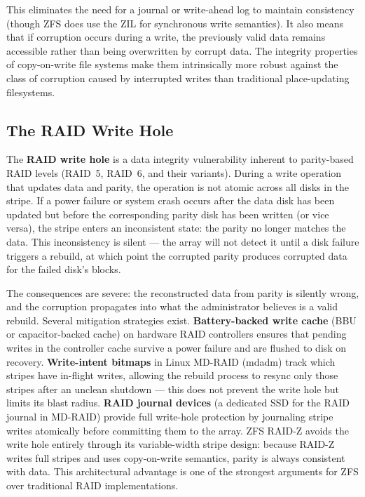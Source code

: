 This eliminates the need for a journal or write-ahead log to maintain consistency (though ZFS does use the ZIL for synchronous write semantics). It also means that if corruption occurs during a write, the previously valid data remains accessible rather than being overwritten by corrupt data. The integrity properties of copy-on-write file systems make them intrinsically more robust against the class of corruption caused by interrupted writes than traditional place-updating filesystems.


\subsection{The RAID Write Hole}

The \textbf{RAID write hole} is a data integrity vulnerability inherent to parity-based RAID levels (RAID~5, RAID~6, and their variants). During a write operation that updates data and parity, the operation is not atomic across all disks in the stripe. If a power failure or system crash occurs after the data disk has been updated but before the corresponding parity disk has been written (or vice versa), the stripe enters an inconsistent state: the parity no longer matches the data. This inconsistency is silent --- the array will not detect it until a disk failure triggers a rebuild, at which point the corrupted parity produces corrupted data for the failed disk's blocks.

The consequences are severe: the reconstructed data from parity is silently wrong, and the corruption propagates into what the administrator believes is a valid rebuild. Several mitigation strategies exist. \textbf{Battery-backed write cache} (BBU or capacitor-backed cache) on hardware RAID controllers ensures that pending writes in the controller cache survive a power failure and are flushed to disk on recovery. \textbf{Write-intent bitmaps} in Linux MD-RAID (mdadm) track which stripes have in-flight writes, allowing the rebuild process to resync only those stripes after an unclean shutdown --- this does not prevent the write hole but limits its blast radius. \textbf{RAID journal devices} (a dedicated SSD for the RAID journal in MD-RAID) provide full write-hole protection by journaling stripe writes atomically before committing them to the array. ZFS RAID-Z avoids the write hole entirely through its variable-width stripe design: because RAID-Z writes full stripes and uses copy-on-write semantics, parity is always consistent with data. This architectural advantage is one of the strongest arguments for ZFS over traditional RAID implementations.


